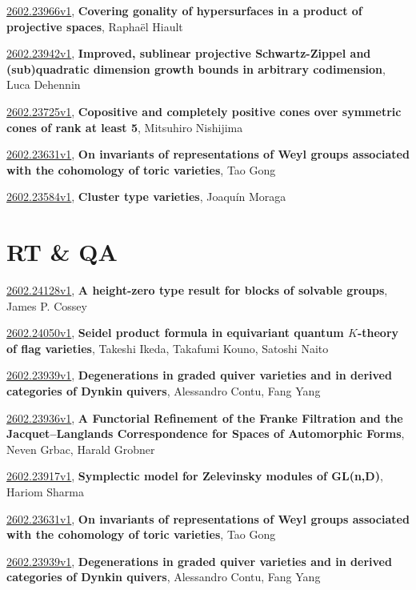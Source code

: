 \documentclass[9pt, a4paper]{article}
\theoremstyle{plain}
\theoremstyle{definition}
\theoremstyle{remark}
\newcommand{\arxiv}[3]{\href{https://arxiv.org/abs/#1}{#1}, \textbf{\textcolor{arxivblue}{#2}}, #3}
\begin{document}
\arxiv{2602.23966v1}{Covering gonality of hypersurfaces in a product of projective spaces}{Raphaël Hiault}

\arxiv{2602.23942v1}{Improved, sublinear projective Schwartz-Zippel and (sub)quadratic dimension growth bounds in arbitrary codimension}{Luca Dehennin}

\arxiv{2602.23725v1}{Copositive and completely positive cones over symmetric cones of rank at least 5}{Mitsuhiro Nishijima}

\arxiv{2602.23631v1}{On invariants of representations of Weyl groups associated with the cohomology of toric varieties}{Tao Gong}

\arxiv{2602.23584v1}{Cluster type varieties}{Joaquín Moraga}


\section{RT \& QA}
\arxiv{2602.24128v1}{A height-zero type result for blocks of solvable groups}{James P. Cossey}

\arxiv{2602.24050v1}{Seidel product formula in equivariant quantum $K$-theory of flag varieties}{Takeshi Ikeda, Takafumi Kouno, Satoshi Naito}

\arxiv{2602.23939v1}{Degenerations in graded quiver varieties and in derived categories of Dynkin quivers}{Alessandro Contu, Fang Yang}

\arxiv{2602.23936v1}{A Functorial Refinement of the Franke Filtration and the Jacquet--Langlands Correspondence for Spaces of Automorphic Forms}{Neven Grbac, Harald Grobner}

\arxiv{2602.23917v1}{Symplectic model for Zelevinsky modules of GL(n,D)}{Hariom Sharma}

\arxiv{2602.23631v1}{On invariants of representations of Weyl groups associated with the cohomology of toric varieties}{Tao Gong}

\arxiv{2602.23939v1}{Degenerations in graded quiver varieties and in derived categories of Dynkin quivers}{Alessandro Contu, Fang Yang}

\end{document}
